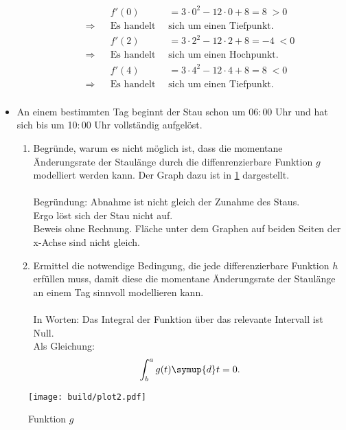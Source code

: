 \begin{itemize}
\begin{enumerate}
\begin{align*}
                 && f'(0) &= 3\cdot 0^2 - 12\cdot 0 +8 = 8\;>0\\
                 \Rightarrow && \text{Es handelt}\;\;& \text{sich um einen Tiefpunkt.}\\
                 && f'(2) &= 3\cdot 2^2 - 12\cdot 2 +8 = -4\;<0\\
                 \Rightarrow && \text{Es handelt}\;\;& \text{sich um einen Hochpunkt.}\\
                 && f'(4) &= 3\cdot 4^2 - 12\cdot 4 +8 = 8\;<0\\
                 \Rightarrow && \text{Es handelt}\;\;& \text{sich um einen Tiefpunkt.}\\
               \end{align*}
           \end{enumerate}
     \item An einem bestimmten Tag beginnt der Stau schon um 06$:$00 Uhr und hat sich bis um 10$:$00 Uhr vollständig aufgelöst.
         \begin{enumerate}
             \item Begründe, warum es nicht möglich ist, dass die momentane Änderungsrate der Staulänge durch die diffenrenzierbare Funktion $g$ modelliert werden kann.
                 Der Graph dazu ist in \ref{fig:g} dargestellt. \\\\
              Begründung: Abnahme ist nicht gleich der Zunahme des Staus.\\
              Ergo löst sich der Stau nicht auf.\\
              Beweis ohne Rechnung. Fläche unter dem Graphen auf beiden Seiten der x-Achse sind nicht gleich.
            \item Ermittel die notwendige Bedingung, die jede differenzierbare Funktion $h$ erfüllen muss, damit diese die momentane Änderungsrate der Staulänge an einem Tag sinnvoll modellieren kann.\\\\
              In Worten: Das Integral der Funktion über das relevante Intervall ist Null.\\
              Als Gleichung:
              \begin{align*}
                \int^{a}_{b}{g(t)\symup{d}t} = 0.
              \end{align*}
        \end{enumerate}
\end{itemize}
\begin{figure}
    \centering
    \texttt{[image: build/plot2.pdf]}
    \caption{Funktion $g$}
    \label{fig:g}
\end{figure}


